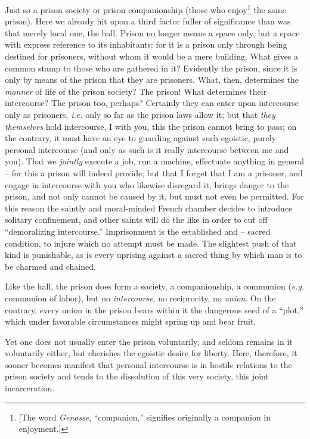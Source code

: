 Just so a prison society or prison companionship (those who 
enjoy\footnote{[The word \textit{Genosse}, ``companion,'' signifies 
originally a companion in enjoyment.]} the same prison). Here we already hit 
upon a third factor fuller of significance than was that merely local one, the 
hall. Prison no longer means a space only, but a space with express reference 
to its inhabitants: for it is a prison only through being destined for 
prisoners, without whom it would be a mere building. What gives a common stamp 
to those who are gathered in it? Evidently the prison, since it is only by 
means of the prison that they are prisoners. What, then, determines the 
\textit{manner} of life of the prison society? The prison! What determines 
their intercourse? The prison too, perhaps? Certainly they can enter upon 
intercourse only as prisoners, \textit{i.e.} only so far as the prison laws 
allow it; but that \textit{they themselves} hold intercourse, I with you, this 
the prison cannot bring to pass; on the contrary, it must have an eye to 
guarding against such egoistic, purely personal intercourse (and only as such 
is it really intercourse between me and you). That we \textit{jointly} execute 
a job, run a machine, effectuate anything in general -- for this a prison will 
indeed provide; but that I forget that I am a prisoner, and engage in 
intercourse with you who likewise disregard it, brings danger to the prison, 
and not only cannot be caused by it, but must not even be permitted. For this 
reason the saintly and moral-minded French chamber decides to introduce 
solitary confinement, and other saints will do the like in order to cut off 
``demoralizing intercourse.'' Imprisonment is the established and -- sacred 
condition, to injure which no attempt must be made. The slightest push of that 
kind is punishable, as is every uprising against a sacred thing by which man 
is to be charmed and chained.

Like the hall, the prison does form a society, a companionship, a communion 
(\textit{e.g.} communion of labor), but no \textit{intercourse}, no 
reciprocity, no \textit{union}. On the contrary, every union in the prison 
bears within it the dangerous seed of a ``plot,'' which under favorable 
circumstances might spring up and bear fruit.

Yet one does not usually enter the prison voluntarily, and seldom remains in 
it voluntarily either, but cherishes the egoistic desire for liberty. Here, 
therefore, it sooner becomes manifest that personal intercourse is in hostile 
relations to the prison society and tends to the dissolution of this very 
society, this joint incarceration.

